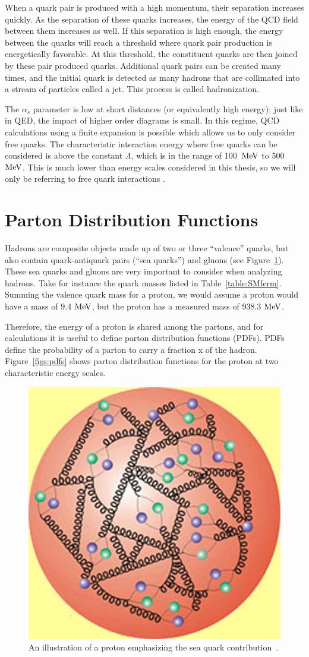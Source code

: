When a quark pair is produced with a high momentum, their separation increases quickly.  
As the separation of these quarks increases, the energy of the QCD field between them increases as well.  
If this separation is high enough, the energy between the quarks will reach a threshold where quark pair production is energetically favorable.  
At this threshold, the constituent quarks are then joined by these pair produced quarks.  
Additional quark pairs can be created many times, and the initial quark is detected as many hadrons that are collimated into a stream of particles called a jet.  
This process is called hadronization.  

The $\alpha_s$ parameter is low at short distances (or equivalently high energy); 
just like in QED, the impact of higher order diagrams is small.  
In this regime, QCD calculations using a finite expansion is possible which allows us to only consider free quarks. 
The characteristic interaction energy where free quarks can be considered is above the constant $\Lambda$, which is in the range of 100~$\mathrm{MeV}$ to 500~$\mathrm{MeV}$.
This is much lower than energy scales considered in this thesis, so we will only be referring to free quark interactions \cite{Griffiths}.  


\section{Parton Distribution Functions}
\label{sec:pdftheory}
Hadrons are composite objects made up of two or three ``valence'' quarks, but also contain quark-antiquark pairs (``sea quarks'') and gluons (see Figure~\ref{figs:partons}).  
These sea quarks and gluons are very important to consider when analyzing hadrons.  
Take for instance the quark masses listed in Table~\ref{table:SMferm}.  
Summing the valence quark mass for a proton, we would assume a proton would have a mass of 9.4$~\mathrm{MeV}$, but the proton has a measured mass of 938.3$~\mathrm{MeV}$.  

Therefore, the energy of a proton is shared among the partons, and for calculations it is useful to define parton distribution functions (PDFs). 
PDFs define the probability of a parton to carry a fraction x of the hadron.  
Figure~\ref{figs:pdfs} shows parton distribution functions for the proton at two characteristic energy scales.  


\begin{figure}
\begin{center}
\includegraphics[width=0.4\linewidth]{figs/partons.jpg}
\caption{An illustration of a proton emphasizing the sea quark contribution~\cite{fnal}.}
\label{figs:partons}
\end{center}
\end{figure}

